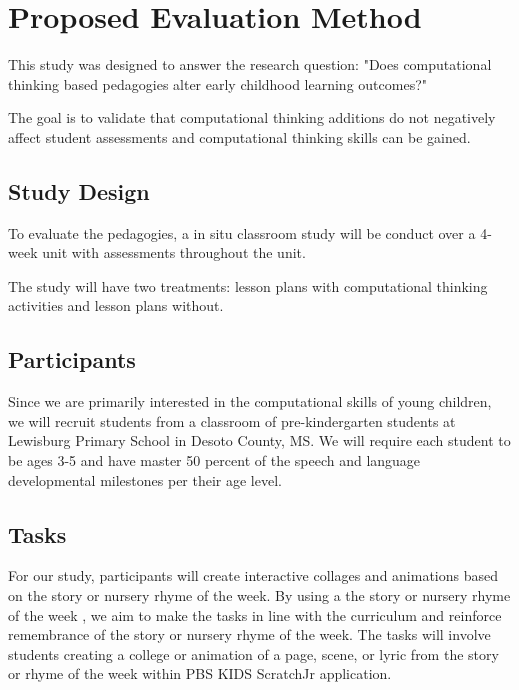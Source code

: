 \documentclass[11pt, letterpaper, onecolumn]{article}
\begin{document}
\section{Proposed Evaluation Method}

This study was designed to answer the research question: "Does computational thinking based pedagogies alter early childhood learning outcomes?"

The goal is to validate that computational thinking additions do not negatively affect student assessments and computational thinking skills can be gained.


\subsection{Study Design}
To evaluate the pedagogies, a in situ classroom study will be conduct over a 4-week unit with assessments throughout the unit. 

The study will have two treatments: lesson plans with computational thinking activities and lesson plans without. 

\subsection{Participants}
%
Since we are primarily interested in the computational skills of young children, we will recruit students from a classroom of pre-kindergarten students at Lewisburg Primary School in Desoto County, MS. 
%
We will require each student to be ages 3-5 and have master 50 percent of the speech and language developmental milestones per their age level. 


\subsection{Tasks}
For our study, participants will create interactive collages and animations based on the story or nursery rhyme of the week. 
%
By using a the story or nursery rhyme of the week , we aim to make the tasks in line with the curriculum and reinforce remembrance of the story or nursery rhyme of the week.
%
The tasks will involve students creating a college or animation of a page, scene, or lyric from the story or rhyme of the week within PBS KIDS ScratchJr application. 
\end{document}
